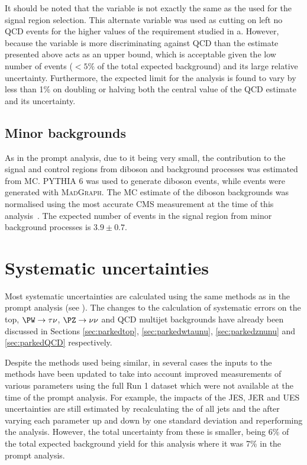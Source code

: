 It should be noted that the \jetmetdphileading variable is not exactly the same as the \jetmetdphi used for the signal region selection. This alternate variable was used as cutting on \jetmetdphi left no \ac{QCD} events for the higher values of the requirement studied in a. However, because the \jetmetdphi variable is more discriminating against \ac{QCD} than \jetmetdphileading the estimate presented above acts as an upper bound, which is acceptable given the low number of events ($<5\%$ of the total expected background) and its large relative uncertainty. Furthermore, the expected limit for the analysis is found to vary by less than 1\% on doubling or halving both the central value of the \ac{QCD} estimate and its uncertainty.


\subsection{Minor backgrounds}
\label{sec:parkedminor}
As in the prompt analysis, due to it being very small, the contribution to the signal and control regions from diboson and \Zmumu background processes was estimated from \ac{MC}. \textsc{PYTHIA 6} was used to generate diboson events, while \Zmumu events were generated with \textsc{MadGraph}. The \ac{MC} estimate of the diboson backgrounds was normalised using the most accurate CMS measurement at the time of this analysis~\cite{Chatrchyan2013190}. The expected number of events in the signal region from minor background processes is $3.9\pm 0.7$.

\section{Systematic uncertainties}
\label{sec:parkedsyst}
Most systematic uncertainties are calculated using the same methods as in the prompt analysis (see ). The changes to the calculation of systematic errors on the top, $\PW\rightarrow\tau\nu$, $\PZ\rightarrow\nu\nu$ and \ac{QCD} multijet backgrounds have already been discussed in Sections \ref{sec:parkedtop}, \ref{sec:parkedwtaunu}, \ref{sec:parkedznunu} and \ref{sec:parkedQCD} respectively.

Despite the methods used being similar, in several cases the inputs to the methods have been updated to take into account improved measurements of various parameters using the full Run 1 dataset which were not available at the time of the prompt analysis. For example, the impacts of the \ac{JES}, \ac{JER} and \ac{UES} uncertainties are still estimated by recalculating the \pt of all jets and the \MET after varying each parameter up and down by one standard deviation and reperforming the analysis. However, the total uncertainty from these is smaller, being 6\% of the total expected background yield for this analysis where it was 7\% in the prompt analysis.

